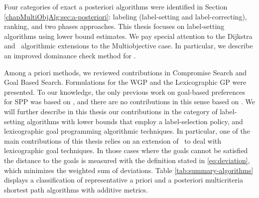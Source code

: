 Four categories of exact a posteriori algorithms were identified in Section \ref{chapMultiObjAlg:sec:a-posteriori}: labeling (label-setting
and label-correcting), ranking, and two phases approaches. This thesis focuses on label-setting algorithms using lower bound estimates. We pay special attention to the Dijkstra and \astar \ algorithmic extensions to the Multiobjective case. In particular, we describe an improved dominance check method for \namoa.

Among a priori methods, we reviewed contributions in Compromise Search and Goal Based Search. Formulations for the WGP and the Lexicographic GP were presented. To our knowledge, the only previous work on goal-based preferences for SPP was based on \moa, and there are no contributions in this sense based on \namoa. We will further describe in this thesis our contributions in the category of label-setting algorithms with lower bounds that employ a label-selection policy, and lexicographic goal programming algorithmic techniques. In particular,
one of the main contributions of this thesis relies on an extension of \namoa \ to deal with lexicographic goal techniques. In those cases where the goals cannot be satisfied the distance to the goals is measured with the definition stated in \ref{eq:deviation}, which minimizes the weighted sum of deviations. Table \ref{tab:summary-algorithms} displays a classification of representative a priori and a posteriori multicriteria shortest path algorithms with additive metrics.

